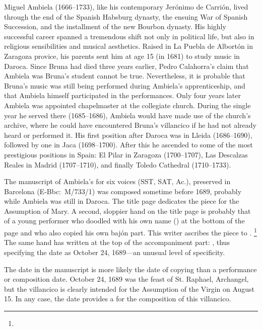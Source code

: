 Miguel Ambiela (1666--1733), like his contemporary Jerónimo de Carrión, lived through the end of the Spanish Habsburg dynasty, the ensuing War of Spanish Succession, and the installment of the new Bourbon dynasty.
His highly successful career spanned a tremendous shift not only in political life, but also in religious sensibilities and musical aesthetics.
Raised in La Puebla de Albortón in Zaragoza provice, his parents sent him at age 15 (in 1681) to study music in Daroca.
Since Bruna had died three years earlier, Pedro Calahorra's claim that Ambiela was Bruna's student cannot be true.
Nevertheless, it is probable that Bruna's music was still being performed during Ambiela's apprenticeship, and that Ambiela himself participated in the performances.
Only four years later Ambiela was appointed chapelmaster at the collegiate church.
During the single year he served there (1685--1686), Ambiela would have made use of the church's archive, where he could have encountered Bruna's villancico if he had not already heard or performed it. 
His first position after Daroca was in Lleida (1686--1690), followed by one in Jaca (1698--1700).
After this he ascended to some of the most prestigious positions in Spain: El Pilar in Zaragoza (1700--1707), Las Descalzas Reales in Madrid (1707--1710), and finally Toledo Cathedral (1710--1733).%
	\autocites[1]{Calahorra:Suban}[]{Grove}{Alvarez:Ambiela}

The manuscript of Ambiela's  for six voices (SST, SAT, Ac.), preserved in Barcelona (E-Bbc:~M/733/1) was composed sometime before 1689, probably while Ambiela was still in Daroca.
The title page dedicates the piece for the Assumption of Mary.
A second, sloppier hand on the title page is probably that of a young performer who doodled with his own name () at the bottom of the page and who also copied his own bajón part.
This writer ascribes the piece to .%
	\footnote{%
	}
The same hand has written at the top of the accompaniment part:  , thus specifying the date as October 24, 1689---an unusual level of specificity.

The date in the manuscript is more likely the date of copying than a performance or composition date.
October 24, 1689 was the feast of St. Raphael, Archangel, but the villancico is clearly intended for the Assumption of the Virgin on August 15.
In any case, the date provides a  for the composition of this villancico.

